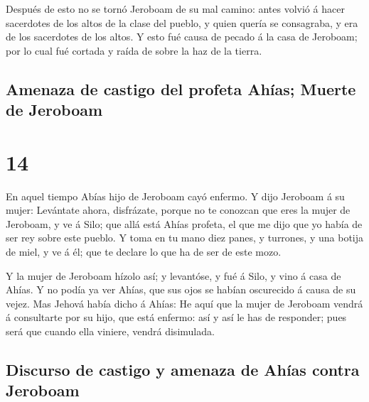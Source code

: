  Después de esto no se tornó Jeroboam de su mal camino:
antes volvió á hacer sacerdotes de los altos de la clase del pueblo, y
quien quería se consagraba, y era de los sacerdotes de los altos.
 Y esto fué causa de pecado á la casa de Jeroboam; por lo
cual fué cortada y raída de sobre la haz de la tierra.

\hypertarget{amenaza-de-castigo-del-profeta-ahuxedas-muerte-de-jeroboam}{%
\subsection{Amenaza de castigo del profeta Ahías; Muerte de
Jeroboam}\label{amenaza-de-castigo-del-profeta-ahuxedas-muerte-de-jeroboam}}

\hypertarget{section-11-14}{%
\section{14}\label{section-11-14}}

 En aquel tiempo Abías hijo de Jeroboam cayó enfermo.
 Y dijo Jeroboam á su mujer: Levántate ahora, disfrázate,
porque no te conozcan que eres la mujer de Jeroboam, y ve á Silo; que
allá está Ahías profeta, el que me dijo que yo había de ser rey sobre
este pueblo.  Y toma en tu mano diez panes, y turrones, y
una botija de miel, y ve á él; que te declare lo que ha de ser de este
mozo.

 Y la mujer de Jeroboam hízolo así; y levantóse, y fué á
Silo, y vino á casa de Ahías. Y no podía ya ver Ahías, que sus ojos se
habían oscurecido á causa de su vejez.  Mas Jehová había
dicho á Ahías: He aquí que la mujer de Jeroboam vendrá á consultarte por
su hijo, que está enfermo: así y así le has de responder; pues será que
cuando ella viniere, vendrá disimulada.

\hypertarget{discurso-de-castigo-y-amenaza-de-ahuxedas-contra-jeroboam}{%
\subsection{Discurso de castigo y amenaza de Ahías contra
Jeroboam}\label{discurso-de-castigo-y-amenaza-de-ahuxedas-contra-jeroboam}}

